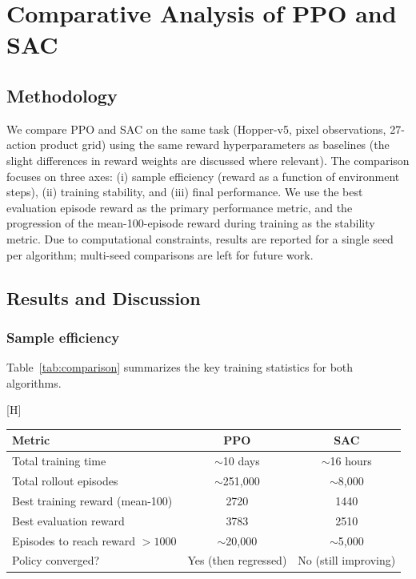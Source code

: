\documentclass[onecolumn]{cwpreport} %
\makeatletter
\renewenvironment{table}[1][htbp]{%
  \@float{table}[#1]%
}{%
  \end@float
}
\makeatother
\begin{document}
\section{Comparative Analysis of PPO and SAC}
\label{sec:comparison}

\subsection{Methodology}

We compare PPO and SAC on the same task (Hopper-v5, pixel observations, 27-action product grid) using the same reward hyperparameters as baselines (the slight differences in reward weights are discussed where relevant). The comparison focuses on three axes: (i) sample efficiency (reward as a function of environment steps), (ii) training stability, and (iii) final performance. We use the best evaluation episode reward as the primary performance metric, and the progression of the mean-100-episode reward during training as the stability metric. Due to computational constraints, results are reported for a single seed per algorithm; multi-seed comparisons are left for future work.

\subsection{Results and Discussion}

\subsubsection{Sample efficiency}

Table~\ref{tab:comparison} summarizes the key training statistics for both algorithms.

\begin{table}[H]
    \centering
    \caption{Comparison of PPO and SAC on Hopper-v5 with pixel observations.}
    \label{tab:comparison}
    \begin{tabular}{lcc}
        \toprule
        \textbf{Metric}                   & \textbf{PPO}         & \textbf{SAC}         \\
        \midrule
        Total training time               & $\sim$10 days        & $\sim$16 hours       \\
        Total rollout episodes            & $\sim$251{,}000      & $\sim$8{,}000        \\
        Best training reward (mean-100)   & 2720                 & 1440                 \\
        Best evaluation reward            & 3783                 & 2510                 \\
        Episodes to reach reward $> 1000$ & $\sim$20{,}000       & $\sim$5{,}000        \\
        Policy converged?                 & Yes (then regressed) & No (still improving) \\
        \bottomrule
    \end{tabular}
\end{table}
\end{document}
